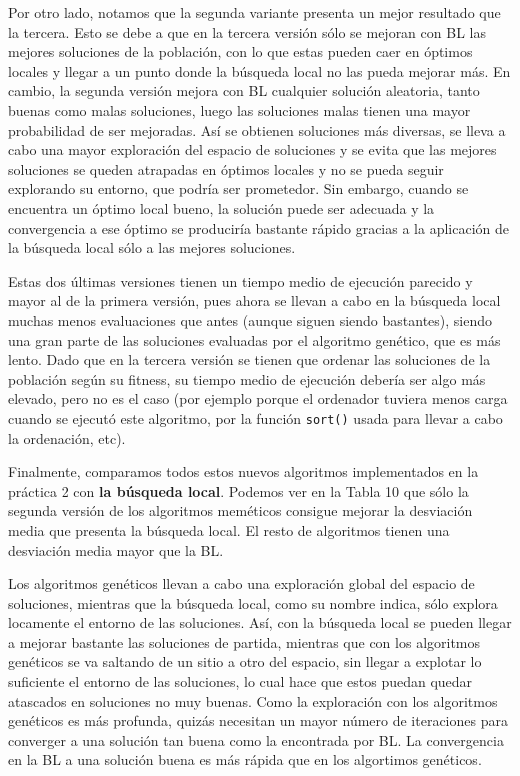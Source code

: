 \documentclass[10pt,a4paper]{article}
\begin{document}
	Por otro lado, notamos que la segunda variante presenta un mejor resultado que la tercera. Esto se debe a que en la tercera versión sólo se mejoran con BL las mejores soluciones de la población, con lo que estas pueden caer en óptimos locales y llegar a un punto donde la búsqueda local no las pueda mejorar más. En cambio, la segunda versión mejora con BL cualquier solución aleatoria, tanto buenas como malas soluciones, luego las soluciones malas tienen una mayor probabilidad de ser mejoradas. Así se obtienen soluciones más diversas, se lleva a cabo una mayor exploración del espacio de soluciones y se evita que las mejores soluciones se queden atrapadas en óptimos locales y no se pueda seguir explorando su entorno, que podría ser prometedor. Sin embargo, cuando se encuentra un óptimo local bueno, la solución puede ser adecuada y la convergencia a ese óptimo se produciría bastante rápido gracias a la aplicación de la búsqueda local sólo a las mejores soluciones. 
	
	Estas dos últimas versiones tienen un tiempo medio de ejecución parecido y mayor al de la primera versión, pues ahora se llevan a cabo en la búsqueda local muchas menos evaluaciones que antes (aunque siguen siendo bastantes), siendo una gran parte de las soluciones evaluadas por el algoritmo genético, que es más lento. Dado que en la tercera versión se tienen que ordenar las soluciones de la población según su fitness, su tiempo medio de ejecución debería ser algo más elevado, pero no es el caso (por ejemplo porque el ordenador tuviera menos carga cuando se ejecutó este algoritmo, por la función \lstinline|sort()| usada para llevar a cabo la ordenación, etc).
	
	Finalmente, comparamos todos estos nuevos algoritmos implementados en la práctica 2 con \textbf{la búsqueda local}. Podemos ver en la Tabla 10 que sólo la segunda versión de los algoritmos meméticos consigue mejorar la desviación media que presenta la búsqueda local. El resto de algoritmos tienen una desviación media mayor que la BL. 
	
	Los algoritmos genéticos llevan a cabo una exploración global del espacio de soluciones, mientras que la búsqueda local, como su nombre indica, sólo explora locamente el entorno de las soluciones. Así, con la búsqueda local se pueden llegar a mejorar bastante las soluciones de partida, mientras que con los algoritmos genéticos se va saltando de un sitio a otro del espacio, sin llegar a explotar lo suficiente el entorno de las soluciones, lo cual hace que estos puedan quedar atascados en soluciones no muy buenas. Como la exploración con los algoritmos genéticos es más profunda, quizás necesitan un mayor número de iteraciones para converger a una solución tan buena como la encontrada por BL. La convergencia en la BL a una solución buena es más rápida que en los algortimos genéticos. 
	
\end{document}
